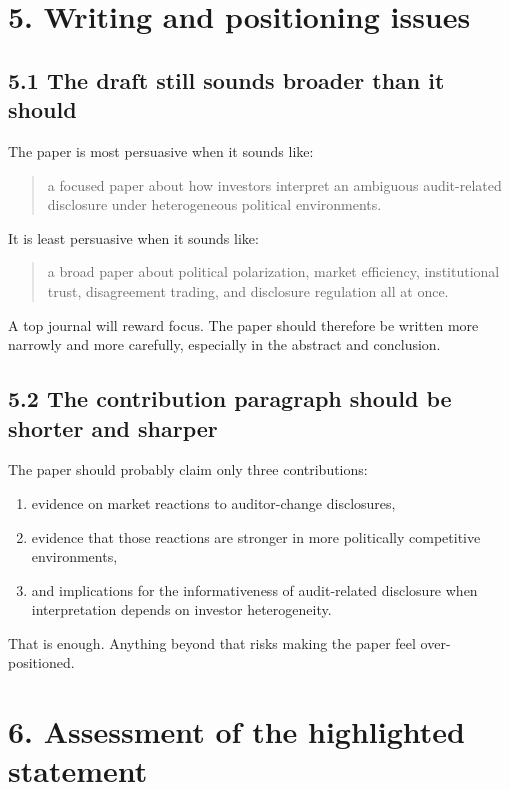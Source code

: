 \section*{5. Writing and positioning issues}

\subsection*{5.1 The draft still sounds broader than it should}

The paper is most persuasive when it sounds like:
\begin{quote}
a focused paper about how investors interpret an ambiguous audit-related disclosure under heterogeneous political environments.
\end{quote}

It is least persuasive when it sounds like:
\begin{quote}
a broad paper about political polarization, market efficiency, institutional trust, disagreement trading, and disclosure regulation all at once.
\end{quote}

A top journal will reward focus. The paper should therefore be written more narrowly and more carefully, especially in the abstract and conclusion.

\subsection*{5.2 The contribution paragraph should be shorter and sharper}

The paper should probably claim only three contributions:
\begin{enumerate}[leftmargin=1.5em]
    \item evidence on market reactions to auditor-change disclosures,
    \item evidence that those reactions are stronger in more politically competitive environments,
    \item and implications for the informativeness of audit-related disclosure when interpretation depends on investor heterogeneity.
\end{enumerate}

That is enough. Anything beyond that risks making the paper feel over-positioned.

\section*{6. Assessment of the highlighted statement}

